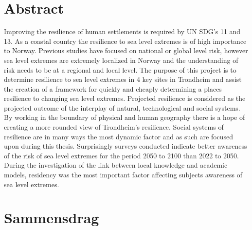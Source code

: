 

\section{Abstract}

Improving the resilience of human settlements is required by UN SDG's 11 and 13. As a coastal country the resilience to sea level extremes is of high importance to Norway. Previous studies have focused on national or global level risk, however sea level extremes are extremely localized in Norway and the understanding of risk needs to be at a regional and local level. The purpose of this project is to determine resilience to sea level extremes in 4 key sites in Trondheim and assist the creation of a framework for quickly and cheaply determining a places resilience to changing sea level extremes. Projected resilience is considered as the projected outcome of the interplay of natural, technological and social systems. By working in the boundary of physical and human geography there is a hope of creating a more rounded view of Trondheim's resilience. Social systems of resilience are in many ways the most dynamic factor and as such are focused upon during this thesis. Surprisingly surveys conducted indicate better awareness of the risk of sea level extremes for the period 2050 to 2100 than 2022 to 2050. During the investigation of the link between local knowledge and academic models, residency was the most important factor affecting subjects awareness of sea level extremes.   



\section{Sammensdrag}


